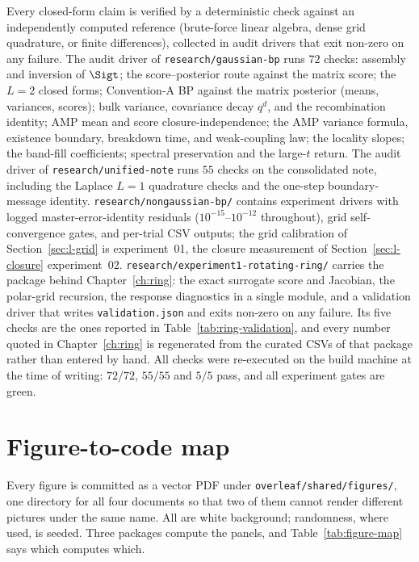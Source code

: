 Every closed-form claim is verified by a deterministic check against an
independently computed reference (brute-force linear algebra, dense grid
quadrature, or finite differences), collected in audit drivers that exit
non-zero on any failure. The audit driver of
\texttt{research/gaussian-bp} runs $72$ checks:
assembly and inversion of $\Sigt$; the score--posterior route against the
matrix score; the $L = 2$ closed forms; Convention-A BP against the
matrix posterior (means, variances, scores); bulk variance, covariance
decay $q^d$, and the recombination identity; AMP mean and score
closure-independence; the AMP variance formula, existence boundary,
breakdown time, and weak-coupling law; the locality slopes; the band-fill
coefficients; spectral preservation and the large-$t$ return.
The audit driver of \texttt{research/unified-note} runs $55$ checks on
the consolidated note, including the Laplace $L = 1$ quadrature checks
and the one-step boundary-message identity.
\texttt{research/nongaussian-bp/} contains experiment drivers with logged
master-error-identity residuals ($10^{-15}$--$10^{-12}$ throughout), grid
self-convergence gates, and per-trial CSV outputs; the grid calibration
of Section~\ref{sec:l-grid} is experiment~01, the closure measurement of
Section~\ref{sec:l-closure} experiment~02.
\texttt{research/experiment1-rotating-ring/} carries the package behind
Chapter~\ref{ch:ring}: the exact surrogate score and Jacobian, the polar-grid
recursion, the response diagnostics in a single module, and a validation driver
that writes \texttt{validation.json} and exits non-zero on any failure. Its five
checks are the ones reported in Table~\ref{tab:ring-validation}, and every
number quoted in Chapter~\ref{ch:ring} is regenerated from the curated CSVs of
that package rather than entered by hand. All checks were re-executed on
the build machine at the time of writing: $72/72$, $55/55$ and $5/5$ pass, and
all experiment gates are green.

\section{Figure-to-code map}

Every figure is committed as a vector PDF under
\texttt{overleaf/shared/figures/}, one directory for all four documents so that
two of them cannot render different pictures under the same name. All are white
background; randomness, where used, is seeded. Three packages compute the
panels, and Table~\ref{tab:figure-map} says which computes which.

